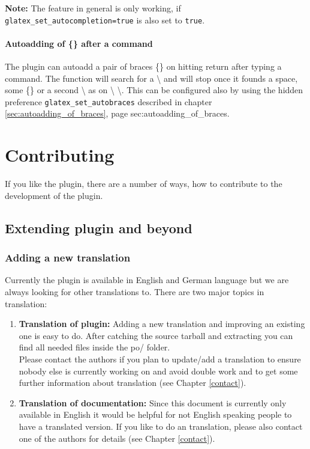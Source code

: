 \documentclass[%
paper=a4,%
fontsize=11pt,%
twoside=false,%
DIV18,%
headsepline,%
plainheadsepline,%
footsepline,%
plainfootsepline,%
bibliography=totoc,%
listof=totoc,%
BCOR10mm,%
parskip=half,%
openany,%
]{scrreprt}
\begin{document}
\textbf{Note:} The feature in general is only working, if
\texttt{glatex\_set\_autocompletion=true} is also set to \texttt{true}.

\subsubsection{Autoadding of \{\} after a command}

The plugin can autoadd a pair of braces \{\} on hitting return after typing a
command. The function will search for a \textbackslash{} and will
stop once it founds a space, some \{\} or a second \textbackslash{}
as on \textbackslash{} \textbackslash{}. This can be configured also
by using the hidden preference \texttt{glatex\_set\_autobraces}
described in chapter \ref{sec:autoadding_of_braces}, page \pageref
{sec:autoadding_of_braces}.


\chapter{Contributing}
If you like the plugin, there are a number of ways, how to
contribute to the development of the plugin.

\section{Extending plugin and beyond}

\subsection{Adding a new translation}
\label{sec:translating}
Currently the plugin is available in English and German language but
we are always looking for other translations to. There are two major
topics in translation:

\begin{enumerate}
\item \textbf{Translation of plugin:}
       Adding a new translation and improving an existing one is easy to
       do. After catching the source tarball and extracting you can find
       all needed files inside the po/ folder. \\
       Please contact the authors if you plan to update/add a translation
       to ensure nobody else is currently working on and avoid double
       work and to get some further information about translation (see
       Chapter \ref{contact}).
\item \textbf{Translation of documentation:}
       Since this document is currently only available in English it
       would be helpful for not English speaking people to have a
       translated version. If you like to do an translation, please
       also contact one of the authors for details (see Chapter \ref{contact}).
\end{enumerate}
\end{document}
